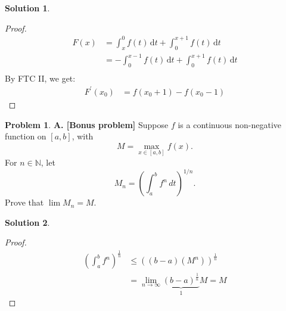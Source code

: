 \documentclass[12pt]{article}
\theoremstyle{definition} %
\newtheorem{solution}{Solution}
\newtheorem{problem}{Problem}
\theoremstyle{plain} %
\begin{document}
\begin{solution}
    \begin{proof}
        \begin{align}
            F(x) &= \int_{x}^{0} f(t) \,\mathrm{d}t + \int_{0}^{x+1} f(t) \,\mathrm{d}t \\[10pt] 
            &= -\int_{0}^{x-1} f(t) \,\mathrm{d}t + \int_{0}^{x+1} f(t) \,\mathrm{d}t \\[10pt] 
        \end{align}
        By FTC II, we get:
        \begin{align}
            F^\prime (x_0) &= f(x_{0}+1) - f(x_{0}-1) 
        \end{align}
    \end{proof}
\end{solution}
\begin{problem}
    \noindent \textbf{A. [Bonus problem]} Suppose $ f $ is a continuous non-negative function on $[a, b]$, with 
$$
M = \max_{x \in [a, b]} f(x).
$$
For $ n \in \mathbb{N} $, let
$$
M_n = \left( \int_a^b f^n \, dt \right)^{1/n}.
$$
Prove that $ \lim M_n = M $.
\end{problem}
\begin{solution}
   \begin{proof}
    \begin{align}
        \left( \int_{a}^{b} f^{n}  \right)^{\frac{1}{n}} &\leq \left( (b-a)(M^{n}) \right)^{\frac{1}{n}} \\[10pt] 
        &= \lim_{n \to \infty} \underbrace{(b-a)^{\frac{1}{n}}}_{1} M = M 
    \end{align}
   \end{proof} 
\end{solution}
\end{document}
